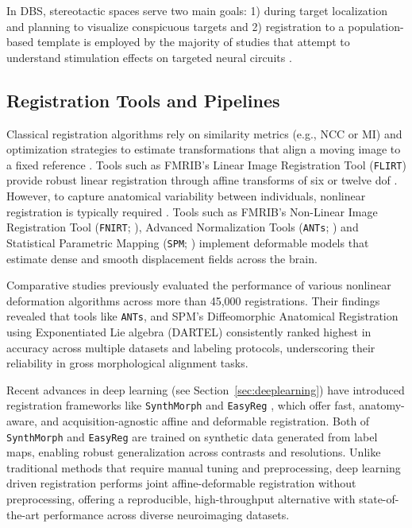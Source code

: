 In DBS, stereotactic spaces serve two main goals: 1) during target localization and planning to visualize conspicuous targets \cite{Stancanello2006-vj} and 2) registration to a population-based template is employed by the majority of studies that attempt to understand stimulation effects on targeted neural circuits \cite{Neudorfer2023-wd}.

\subsection{Registration Tools and Pipelines}
Classical registration algorithms rely on similarity metrics (e.g., NCC or MI) and optimization strategies to estimate transformations that align a moving image to a fixed reference \cite{Hoffmann2024-yd}. Tools such as FMRIB's Linear Image Registration Tool (\texttt{FLIRT}) provide robust linear registration through affine transforms of six or twelve dof \cite{Jenkinson2001-bw, Jenkinson2002-ab}. However, to capture anatomical variability between individuals, nonlinear registration is typically required \cite{Klein2009-lv}. Tools such as FMRIB's Non-Linear Image Registration Tool (\texttt{FNIRT}; \cite{Jenkinson2001-bw}), Advanced Normalization Tools (\texttt{ANTs}; \cite{Avants2011-zs}) and Statistical Parametric Mapping (\texttt{SPM}; \cite{Ashburner2007-en}) implement deformable models that estimate dense and smooth displacement fields across the brain.

Comparative studies \cite{Klein2009-lv, Ewert2019-cc} previously evaluated the performance of various nonlinear deformation algorithms across more than 45,000 registrations. Their findings revealed that tools like \texttt{ANTs}, and SPM's Diffeomorphic Anatomical Registration using Exponentiated Lie algebra (DARTEL) consistently ranked highest in accuracy across multiple datasets and labeling protocols, underscoring their reliability in gross morphological alignment tasks.

Recent advances in deep learning (see Section~\ref{sec:deeplearning}) have introduced registration frameworks like \texttt{SynthMorph} \cite{Hoffmann2024-yd} and \texttt{EasyReg} \cite{Iglesias2023-ni}, which offer fast, anatomy-aware, and acquisition-agnostic affine and deformable registration. Both of \texttt{SynthMorph} and \texttt{EasyReg} are trained on synthetic data generated from label maps, enabling robust generalization across contrasts and resolutions. Unlike traditional methods that require manual tuning and preprocessing, deep learning driven registration performs joint affine-deformable registration without preprocessing, offering a reproducible, high-throughput alternative with state-of-the-art performance across diverse neuroimaging datasets. 

